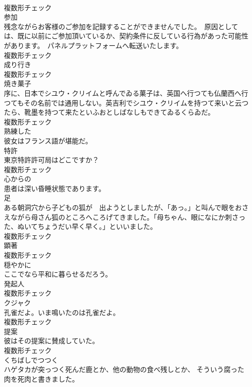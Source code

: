 \documentclass[8pt]{extreport}
\begin{document}
\begin{CJK}{UTF8}{min}
\\	複数形チェック
\\	[名詞]	参加	
\\	残念ながらお客様のご参加を記録することができませんでした。　原因としては、既に以前にご参加頂いているか、契約条件に反している行為があった可能性があります。　パネルプラットフォームへ転送いたします。	
\\	複数形チェック
\\	[名詞]	成り行き	
\\	複数形チェック
\\	[名詞]	焼き菓子	
\\	序に、日本でシユウ・クリイムと呼んでゐる菓子は、英国へ行つても仏蘭西へ行つてもその名前では通用しない。英吉利でシユウ・クリイムを持つて来いと云つたら、靴墨を持つて来たといふおとしばなしもできてゐるくらゐだ。	
\\	複数形チェック
\\	[形容詞]	熟練した	
\\	彼女はフランス語が堪能だ。	
\\	[名詞]	特許	
\\	東京特許許可局はどこですか？	
\\	複数形チェック
\\	[形容詞]	心からの	
\\	患者は深い昏睡状態であります。	
\\	[名詞]	足	
\\	ある朝洞穴から子どもの狐が　出ようとしましたが、「あっ。」と叫んで眼をおさえながら母さん狐のところへころげてきました。「母ちゃん、眼になにか刺さった、ぬいてちょうだい早く早く。」といいました。	
\\	複数形チェック
\\	[名詞]	顕著	
\\	複数形チェック
\\	[副詞]	穏やかに	
\\	ここでなら平和に暮らせるだろう。	
\\	[名詞]	発起人	
\\	複数形チェック
\\	[名詞]	クジャク	
\\	孔雀だよ。いま鳴いたのは孔雀だよ。	
\\	複数形チェック
\\	[名詞]	提案	
\\	彼はその提案に賛成していた。	
\\	複数形チェック
\\	[動詞]	くちばしでつつく	
\\	ハゲタカが突っつく死んだ鹿とか、他の動物の食べ残しとか、 そういう腐った肉を死肉と書きました。	

\end{CJK}
\end{document}
